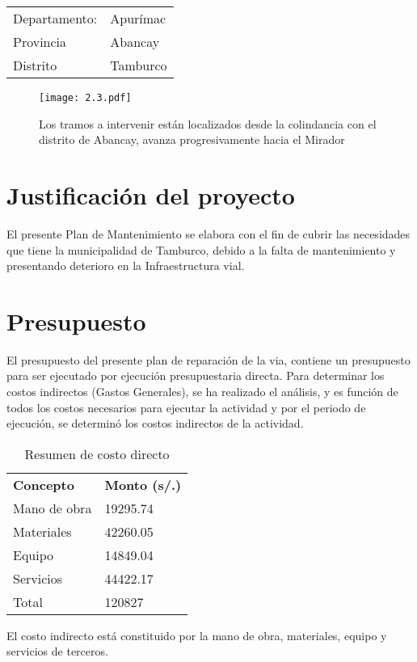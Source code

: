 \begin{tabular}{ll}
	Departamento: & Apurímac \\
	Provincia     & Abancay  \\
	Distrito      & Tamburco
\end{tabular}

\begin{figure}[h]
	\captionsetup{width=0.8\textwidth}
	\centering
	\texttt{[image: 2.3.pdf]}
	\caption[Ubicación geográfica del proyecto]{Los tramos a intervenir están localizados desde la colindancia con el distrito de Abancay, avanza progresivamente hacia el Mirador }
	\label{fig:localizacion}
\end{figure}

\section{Justificación del proyecto}
El presente Plan de Mantenimiento se elabora con el fin de cubrir las necesidades que tiene la municipalidad de Tamburco, debido a la falta de mantenimiento y presentando deterioro en la Infraestructura vial.

\section{Presupuesto}
El presupuesto del presente plan de reparación de la via, contiene un presupuesto para ser ejecutado por ejecución presupuestaria directa.
Para determinar los costos indirectos (Gastos Generales), se ha realizado el análisis, y es función de todos los costos necesarios para ejecutar la actividad y por el periodo de ejecución, se determinó los costos indirectos de la actividad.\\

\begin{table}[H]
	\centering
	\begin{tabular}{l l }
		\toprule
		\textbf{Concepto} & \textbf{Monto (s/.)} \\ \cmidrule{1-2}
		Mano de obra      & 19295.74             \\ %
		Materiales        & 42260.05             \\
		Equipo            & 14849.04             \\
		Servicios         & 44422.17             \\ \midrule
		Total             & 120827               \\ \bottomrule
	\end{tabular}
	\caption{Resumen de costo directo }
	\label{rps1}
\end{table}
El costo indirecto está constituido por la mano de obra, materiales, equipo y servicios de terceros.
\vspace{3mm}

